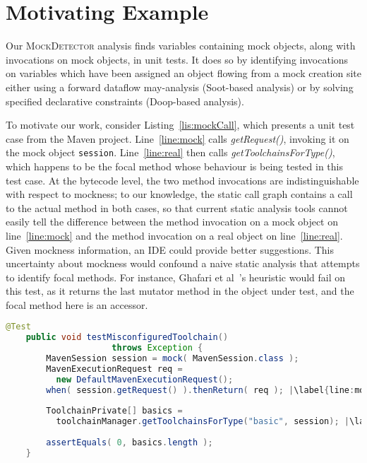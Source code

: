 \section{Motivating Example}
\label{sec:motivating-example}

Our \textsc{MockDetector} analysis finds variables containing mock objects, along with invocations on mock objects, in unit tests. It does so by identifying invocations on variables which have been assigned an object flowing from a mock creation site either using a forward dataflow may-analysis (Soot-based analysis) or by solving specified declarative constraints (Doop-based analysis).

To motivate our work, consider Listing~\ref{lis:mockCall}, which presents a unit test case from the Maven project. Line~\ref{line:mock} calls \textit{getRequest()}, invoking it on the mock object \texttt{session}. Line~\ref{line:real} then calls \textit{getToolchainsForType()}, which happens to be the focal method whose behaviour is being tested in this test case. At the bytecode level, the two method invocations are indistinguishable with respect to mockness; to our knowledge, the static call graph contains a call to the actual method in both cases, so that current static analysis tools cannot easily tell the difference between the method invocation on a mock object on line~\ref{line:mock} and the method invocation on a real object on line~\ref{line:real}. Given mockness information, an IDE could provide better suggestions. This uncertainty about mockness would confound a naive static analysis that attempts to identify focal methods. For instance, Ghafari et al~\cite{ghafari15:_autom}'s heuristic would fail on this test, as it returns the last mutator method in the object under test, and the focal method here is an accessor. 

\begin{lstlisting}[basicstyle=\ttfamily, caption={This code snippet illustrates an example from maven-core, where calls to both the focal method \texttt{getToolchainsForType()} and to mock \texttt{session}'s \texttt{getRequest()} method occur in test \textit{testMisconfiguredToolchain()}.},
basicstyle=\scriptsize\ttfamily,language = Java, framesep=4.5mm, escapechar=|,
framexleftmargin=1.0mm, captionpos=b, label=lis:mockCall, morekeywords={@Test}]
	@Test
	public void testMisconfiguredToolchain()
	                 throws Exception {
	    MavenSession session = mock( MavenSession.class );
	    MavenExecutionRequest req = 
	      new DefaultMavenExecutionRequest();
	    when( session.getRequest() ).thenReturn( req ); |\label{line:mock}|
	    
	    ToolchainPrivate[] basics =
	      toolchainManager.getToolchainsForType("basic", session); |\label{line:real}|
	    
	    assertEquals( 0, basics.length );
	}
\end{lstlisting}

